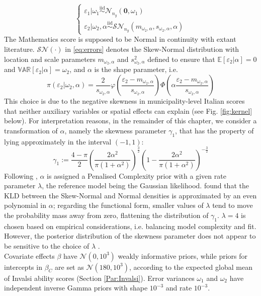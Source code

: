 \documentclass[openany, 11pt, oneside]{book}
\begin{document}
\begin{equation}
\left\{
\begin{array}{ll}
\varepsilon_{1} \vert \omega_1 \overset{\text{iid}}{\sim}
\mathcal{N}_{n_y}(\boldsymbol{0}, \omega_1)\\
\varepsilon_{2} \vert \omega_2, \alpha 
\overset{\text{iid}}{\sim} \mathcal{SN}_{n_y}(m_{\omega_2, \alpha}, s_{\omega_2, \alpha}, \alpha)  
\end{array}
\right.
\label{eq:errors}
\end{equation} 
The Mathematics score is supposed to be Normal in continuity with extant literature. $\mathcal{SN}(\cdot)$ in \ref{eq:errors} denotes the Skew-Normal distribution \parencite{SN} with location and scale parameters $m_{\omega_2, \alpha}$ and $ s_{\omega_2, \alpha}^2$ defined to ensure that $\mathbb{E}[\varepsilon_2 \vert \alpha] = 0 $ and $\mathbb{VAR}[\varepsilon_2 \vert \alpha] = \omega_2$, and $\alpha$ is the shape parameter, i.e.
$$
\pi(\varepsilon_2 \vert \omega_2, \alpha) = \frac{2}{s_{\omega_2, \alpha}}
\varphi\left(\frac{\varepsilon_2 - m_{\omega_2,\alpha}}{s_{\omega_2, \alpha}}
\right) \Phi \left( 
\alpha \frac{\varepsilon_2 - m_{\omega_2,\alpha}}{s_{\omega_2, \alpha}}
\right)
$$
This choice is due to the negative skewness in municipality-level Italian scores that neither auxiliary variables or spatial effects can explain (see Fig. \ref{fig:kernel} below). For interpretation reasons, in the remainder of this chapter, we consider a transformation of $\alpha$, namely the skewness parameter $\gamma_1$, that has the property of lying approximately in the interval $(-1, 1)$:
$$
\gamma_{1} := \frac{4-\pi}{2}
\left(  \frac{2 \alpha^2}{\pi(1 + \alpha^2)} \right)^{\frac{3}{2}}
\left(  1 - \frac{2 \alpha^2}{\pi(1 + \alpha^2)} \right)^{-\frac{3}{2}}
$$
Following \cite{SNprior}, $\alpha$ is assigned a Penalised Complexity prior with a given rate parameter $\lambda$, the reference model being the Gaussian likelihood. \cite{SNprior} found that the KLD between the Skew-Normal and Normal densities is approximated by an even polynomial in $\alpha$; regarding the functional form, smaller values of $\lambda$ tend to move the probability mass away from zero, flattening the distribution of $\gamma_1$. 
$\lambda = 4$ is chosen based on empirical considerations, i.e. balancing model complexity and fit. However, the posterior distribution of the skewness parameter does not appear to be sensitive to the choice of $\lambda$ \parencite{SNprior}.\\

Covariate effects $\beta$ have $\mathcal{N}(0, 10^3)$ weakly informative priors, while priors for intercepts in $\beta_C$ are set as $\mathcal{N}(180, 10^3)$, according to the expected global mean of Invalsi ability scores (Section \ref{Par:Invalsi}).
Error variances $\omega_{1}$ and $\omega_2$ have independent inverse Gamma priors with shape $10^{-3}$ and rate $10^{-3}$.
\end{document}

